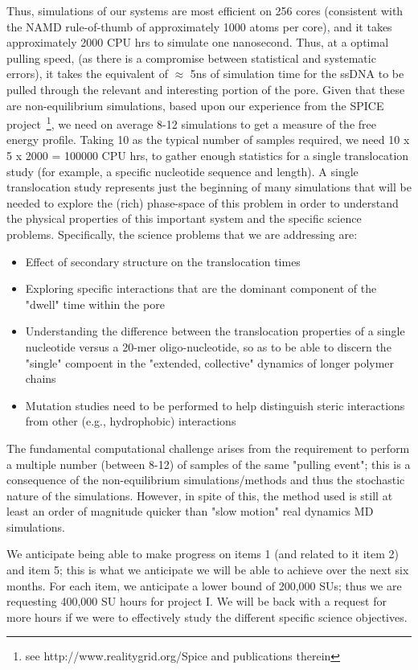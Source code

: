 \documentclass[a4paper,10pt]{article}
\begin{document}
Thus, simulations of our systems are most efficient on 256 cores (consistent with the NAMD rule-of-thumb of approximately 1000 atoms per core), and it
takes approximately 2000 CPU hrs to simulate one nanosecond. 
Thus, at a optimal pulling speed, (as there is a compromise between statistical and systematic errors),  it takes the equivalent of $\approx$ 5ns of simulation time for the ssDNA to be pulled through the relevant and interesting portion of the pore. Given that these are non-equilibrium
simulations, based upon our experience from the SPICE project~\footnote{see http://www.realitygrid.org/Spice and publications therein}, we need 
on average 8-12 simulations to get a measure of the free energy profile.  Taking
10 as the typical number of samples required, we need 10 x 5 x 2000 = 100000 CPU hrs, to
gather enough statistics for a single  translocation study (for example, a
specific nucleotide sequence and length).
A single translocation study represents just the beginning of many simulations that will be needed to explore
the (rich) phase-space of this problem in order to understand the physical
properties of this important system and the specific science problems.
Specifically, the science problems that we are addressing are:
\begin{itemize}
\item Effect of secondary structure on the translocation times
\item  Exploring specific interactions that are the dominant component
of the "dwell" time within the pore
\item Understanding the difference between the translocation properties
of a single nucleotide versus a 20-mer oligo-nucleotide, so as to 
be able to discern the "single" compoent in the "extended, collective"
dynamics of longer polymer chains
\item Mutation studies need to be performed to help distinguish steric interactions from other (e.g.,
hydrophobic) interactions
\end{itemize}

The fundamental computational challenge arises from the requirement to perform
a multiple number (between 8-12) of samples of the same "pulling event"; this is
a consequence of the non-equilibrium simulations/methods and thus the stochastic nature of the simulations. However, in spite of this, the method used 
is still at least an order of magnitude quicker than "slow motion" real dynamics MD simulations.

We anticipate being able to make progress on items 1 (and related to it item 2)
and item 5; this is what we anticipate we will be able to achieve over the next six months. 
For each item, we anticipate a lower bound of 200,000 SUs; thus we are requesting
400,000 SU hours for project I. We will be back 
with a request for more hours if we were to effectively study the different specific
science objectives.
\end{document}
